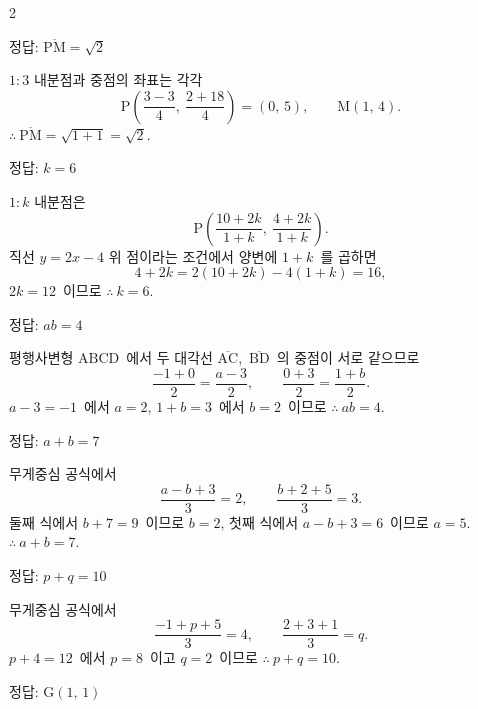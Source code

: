\documentclass[10pt,fleqn]{article}   %
\begin{document}
\begin{multicols*}{2}
\begin{dmanswerbox}
정답: $\overline{\mathrm{PM}}=\sqrt{2}$
\end{dmanswerbox}

$1 : 3$ 내분점과 중점의 좌표는 각각
$$\mathrm{P}\!\left( \dfrac{3-3}{4},\ \dfrac{2+18}{4} \right) = (0,\,5),\qquad \mathrm{M}(1,\,4).$$
$\therefore\ \overline{\mathrm{PM}} = \sqrt{1+1} = \sqrt{2}$.

\begin{dmanswerbox}
정답: $k=6$
\end{dmanswerbox}

$1 : k$ 내분점은
\[ \mathrm{P}\!\left( \dfrac{10+2k}{1+k},\ \dfrac{4+2k}{1+k} \right). \]
직선 $y = 2x - 4$ 위 점이라는 조건에서 양변에 $1+k$\ 를 곱하면
\[ 4+2k = 2(10+2k) - 4(1+k) = 16, \]
$2k = 12$\ 이므로 $\therefore\ k = 6$.

\begin{dmanswerbox}
정답: $ab=4$
\end{dmanswerbox}

평행사변형 $\mathrm{ABCD}$\ 에서 두 대각선 $\overline{\mathrm{AC}}$,\ $\overline{\mathrm{BD}}$\ 의 중점이 서로 같으므로
$$\dfrac{-1+0}{2} = \dfrac{a-3}{2},\qquad \dfrac{0+3}{2} = \dfrac{1+b}{2}.$$
$a-3=-1$\ 에서 $a=2$, $1+b=3$\ 에서 $b=2$\ 이므로 $\therefore\ ab = 4$.

\begin{dmanswerbox}
정답: $a+b=7$
\end{dmanswerbox}

무게중심 공식에서
$$\dfrac{a-b+3}{3} = 2,\qquad \dfrac{b+2+5}{3} = 3.$$
둘째 식에서 $b + 7 = 9$\ 이므로 $b = 2$, 첫째 식에서 $a - b + 3 = 6$\ 이므로 $a = 5$. $\therefore\ a + b = 7$.

\begin{dmanswerbox}
정답: $p+q=10$
\end{dmanswerbox}

무게중심 공식에서
$$\dfrac{-1+p+5}{3} = 4,\qquad \dfrac{2+3+1}{3} = q.$$
$p+4=12$\ 에서 $p=8$\ 이고 $q=2$\ 이므로 $\therefore\ p + q = 10$.

\begin{dmanswerbox}
정답: $\mathrm{G}(1,\,1)$
\end{dmanswerbox}


\end{multicols*}
\end{document}
